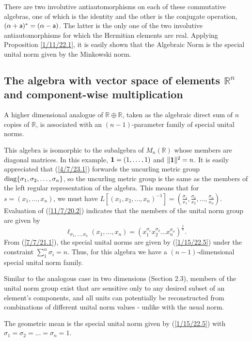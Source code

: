\documentclass{amsart}
\numberwithin{equation}{section}
\theoremstyle{definition}
\numberwithin{theorem}{section}
\begin{document}
 There are two involutive antiautomorphisms on each of these commutative algebras, one of which is the identity and the other is the conjugate operation, $(\alpha+ {\sf a})^* = (\alpha- {\sf a})$. The latter is the only one of the two involutive antiautomorphisms  for which the Hermitian elements are real.  Applying Proposition \ref{1/11/22.1}, it is easily shown that the Algebraic Norm is the special unital norm given by the Minkowski norm.   

 
 \subsection{The algebra with vector space of elements $\mathbb{R}^n$ and component-wise multiplication} A higher dimensional analogue of $\mathbb{R}\oplus \mathbb{R}$, taken as the algebraic direct sum of $n$ copies of $\mathbb{R}$, is associated with an $(n-1)$-parameter family of  special unital norms.

 This algebra is isomorphic to the subalgebra of $ M_n(\mathbb{R})$  whose members are diagonal matrices. In this example, ${\bf 1} = (1,\dots,1)$ and $\|{\bf 1}\|^2 = n$.   It is easily appreciated that (\ref{4/7/23.1}) forwards the uncurling metric group ${\rm diag} \{ \sigma_1, \sigma_2,\dots,\sigma_n\}$, so the uncurling metric group is the same as the members of the left regular representation of the algebra.  This means that for $s=(x_1,\dots,x_n)$, we must have $L[(x_1,x_2,\dots,x_n)^{-1}] = (\frac{\sigma_1}{x_1}, \frac{\sigma_2}{x_2},\dots,\frac{\sigma_n}{x_n})$.     Evaluation of (\ref{11/7/20.2}) indicates that the members of the unital norm group are given by  \begin{equation}\label{1/15/22.5} \ell_{\sigma_1,\dots,\sigma_n}(x_1,\dots,x_n) = (x_1^{\sigma_1} x_2^{\sigma_2} \dots x_n^{\sigma_n})^\frac{1}{n}. \end{equation} From (\ref{7/7/21.1}), the special unital norms are given by (\ref{1/15/22.5}) under the constraint $\sum_1^n \sigma_i = n$. Thus, for this algebra we have a $(n-1)$-dimensional special unital norm family.   
 
 Similar to the analogous case in two dimensions (Section 2.3), members of the unital norm group exist that are sensitive only to any desired subset of an element's components, and all units can potentially be reconstructed from combinations of different unital norm values - unlike with the usual norm.
 
 The geometric mean is the special unital norm given by (\ref{1/15/22.5}) with $\sigma_1=\sigma_2=\dots =\sigma_n = 1$.  
   
\end{document}
